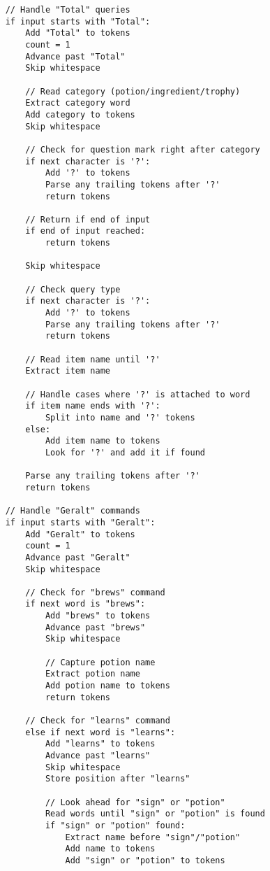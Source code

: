 \documentclass{article}
\begin{document}
\begin{verbatim}
    // Handle "Total" queries
    if input starts with "Total":
        Add "Total" to tokens
        count = 1
        Advance past "Total"
        Skip whitespace
        
        // Read category (potion/ingredient/trophy)
        Extract category word
        Add category to tokens
        Skip whitespace
        
        // Check for question mark right after category
        if next character is '?':
            Add '?' to tokens
            Parse any trailing tokens after '?'
            return tokens
            
        // Return if end of input
        if end of input reached:
            return tokens
            
        Skip whitespace
        
        // Check query type
        if next character is '?':
            Add '?' to tokens
            Parse any trailing tokens after '?'
            return tokens
            
        // Read item name until '?'
        Extract item name
        
        // Handle cases where '?' is attached to word
        if item name ends with '?':
            Split into name and '?' tokens
        else:
            Add item name to tokens
            Look for '?' and add it if found
            
        Parse any trailing tokens after '?'
        return tokens
    
    // Handle "Geralt" commands
    if input starts with "Geralt":
        Add "Geralt" to tokens
        count = 1
        Advance past "Geralt"
        Skip whitespace
        
        // Check for "brews" command
        if next word is "brews":
            Add "brews" to tokens
            Advance past "brews"
            Skip whitespace
            
            // Capture potion name
            Extract potion name
            Add potion name to tokens
            return tokens
            
        // Check for "learns" command
        else if next word is "learns":
            Add "learns" to tokens
            Advance past "learns"
            Skip whitespace
            Store position after "learns"
            
            // Look ahead for "sign" or "potion"
            Read words until "sign" or "potion" is found
            if "sign" or "potion" found:
                Extract name before "sign"/"potion"
                Add name to tokens
                Add "sign" or "potion" to tokens
                

\end{verbatim}
\end{document}
